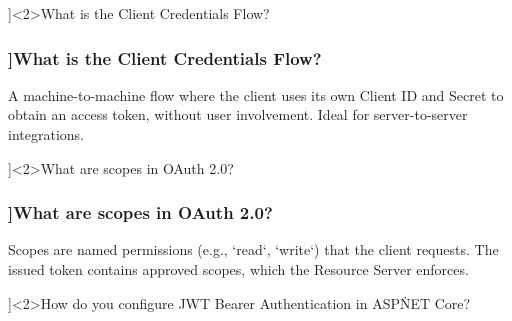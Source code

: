 \begin{frame}
\begin{center}
{%
  }
  \end{center}
\end{frame}

\QuestionSlide[\CategoryBadge[AuthColor!20]{Security}]<2>{What is the Client Credentials Flow?}

\begin{frame}[fragile]
  \frametitle{\AnswerTitle[\CategoryBadge[OOPColor!20]{C\#} ]{What is the Client Credentials Flow?}}

  {\footnotesize
  A machine-to-machine flow where the client uses its own Client ID and Secret to obtain an access token, without user involvement. Ideal for server-to-server integrations.
  }
\end{frame}

\QuestionSlide[\CategoryBadge[AuthColor!20]{Security}]<2>{What are scopes in OAuth 2.0?}

\begin{frame}[fragile]
  \frametitle{\AnswerTitle[\CategoryBadge[OOPColor!20]{C\#} ]{What are scopes in OAuth 2.0?}}

  {\footnotesize
  Scopes are named permissions (e.g., `read`, `write`) that the client requests. The issued token contains approved scopes, which the Resource Server enforces.
  }
\end{frame}

\QuestionSlide[\CategoryBadge[AuthColor!20]{Security}]<2>{How do you configure JWT Bearer Authentication in ASP\.NET Core?}

